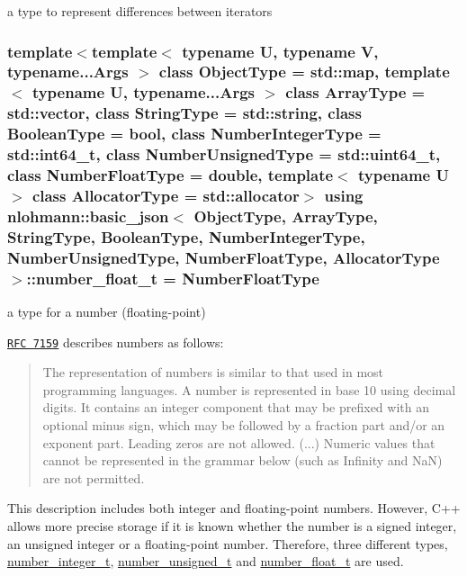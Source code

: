 a type to represent differences between iterators 

\hypertarget{classnlohmann_1_1basic__json_a74a0013e847fdc574b48f931f0e757e1}{
\subsubsection[{number\-\_\-float\-\_\-t}]{\setlength{\rightskip}{0pt plus 5cm}template$<$template$<$ typename U, typename V, typename...\-Args $>$ class Object\-Type = std\-::map, template$<$ typename U, typename...\-Args $>$ class Array\-Type = std\-::vector, class String\-Type  = std\-::string, class Boolean\-Type  = bool, class Number\-Integer\-Type  = std\-::int64\-\_\-t, class Number\-Unsigned\-Type  = std\-::uint64\-\_\-t, class Number\-Float\-Type  = double, template$<$ typename U $>$ class Allocator\-Type = std\-::allocator$>$ using {\bf nlohmann\-::basic\-\_\-json}$<$ Object\-Type, Array\-Type, String\-Type, Boolean\-Type, Number\-Integer\-Type, Number\-Unsigned\-Type, Number\-Float\-Type, Allocator\-Type $>$\-::{\bf number\-\_\-float\-\_\-t} =  Number\-Float\-Type}}\label{classnlohmann_1_1basic__json_a74a0013e847fdc574b48f931f0e757e1}


a type for a number (floating-\/point) 

\href{http://rfc7159.net/rfc7159}{\tt R\-F\-C 7159} describes numbers as follows\-: \begin{quotation}
The representation of numbers is similar to that used in most programming languages. A number is represented in base 10 using decimal digits. It contains an integer component that may be prefixed with an optional minus sign, which may be followed by a fraction part and/or an exponent part. Leading zeros are not allowed. (...) Numeric values that cannot be represented in the grammar below (such as Infinity and Na\-N) are not permitted.

\end{quotation}


This description includes both integer and floating-\/point numbers. However, C++ allows more precise storage if it is known whether the number is a signed integer, an unsigned integer or a floating-\/point number. Therefore, three different types, \hyperlink{classnlohmann_1_1basic__json_ac4b10b2364f26ce47bdb9a413ff04a59}{number\-\_\-integer\-\_\-t}, \hyperlink{classnlohmann_1_1basic__json_a60a04166c122072ab11eaf9845d9cd1d}{number\-\_\-unsigned\-\_\-t} and \hyperlink{classnlohmann_1_1basic__json_a74a0013e847fdc574b48f931f0e757e1}{number\-\_\-float\-\_\-t} are used.

